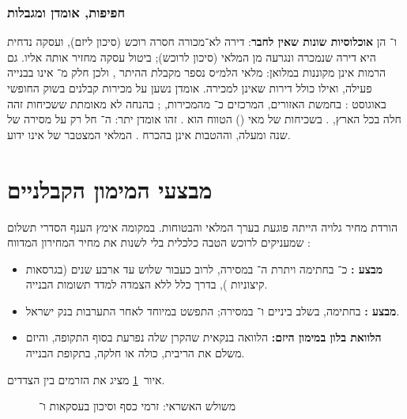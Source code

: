 \subsubsection{חפיפות, אומדן ומגבלות}
\label{sec:ch3-tam-limits}
 ו־ הן \textbf{אוכלוסיות שונות שאין לחבר}: דירה לא־מכורה חסרה רוכש (סיכון ליזם), ועסקה נדחית היא דירה שנמכרה ונגרעה מן המלאי (סיכון לרוכש); ביטול עסקה מחזיר אותה אליו. גם הרמות אינן מקוננות במלואן: מלאי הלמ״ס נספר מקבלת ההיתר \cite{boi_annual2025_housing}, ולכן חלק מ־ אינו בבנייה פעילה, ואילו  כולל דירות שאינן למכירה. אומדן  נשען על  מכירות קבלנים בשוק החופשי באוגוסט \cite{mof_review_2026_08}: בחמשת האזורים, המרכזים כ־ מהמכירות, \mbox{}; בהנחה לא מאומתת ששכיחות זהה חלה בכל הארץ, \mbox{}. בשכיחות של מאי () הטווח הוא . זהו אומדן יתר: ה־ חל רק על מסירה של שנה ומעלה, וההטבות אינן בהכרח . המלאי המצטבר של  אינו ידוע.

\section{מבצעי המימון הקבלניים}
\label{sec:ch3-promotions}

הורדת מחיר גלויה הייתה פוגעת בערך המלאי והבטוחות. במקומה אימץ הענף הסדרי תשלום שמעניקים לרוכש הטבה כלכלית בלי לשנות את מחיר המחירון המדווח \cite{boi_fsr2024h2,boi_circular2816}:
\begin{itemize}
  \item \textbf{מבצע :} כ־ בחתימה ויתרת ה־ במסירה, לרוב כעבור שלוש עד ארבע שנים (בגרסאות קיצוניות ), בדרך כלל ללא הצמדה למדד תשומות הבנייה.
  \item \textbf{מבצע :}  בחתימה,  בשלב ביניים ו־ במסירה; התפשט במיוחד לאחר התערבות בנק ישראל.
  \item \textbf{הלוואת בלון במימון היזם:} הלוואה בנקאית שהקרן שלה נפרעת בסוף התקופה, והיזם משלם את הריבית, כולה או חלקה, בתקופת הבנייה.
\end{itemize}
איור~\ref{fig:credit-triangle} מציג את הזרמים בין הצדדים.

\begin{figure}[!htb]
\centering

\caption{משולש האשראי: זרמי כסף וסיכון בעסקאות  ו־}
\label{fig:credit-triangle}
\end{figure}

